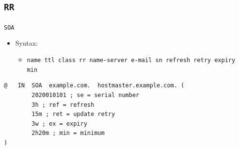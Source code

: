 \documentclass[aspectratio=169,xcolor=table]{beamer}
\begin{document}
\subsection{\texttt{RR}}
\begin{frame}[fragile]{\texttt{SOA}}
  \begin{itemize}
    \item Syntax:
      \begin{itemize}
        \item \texttt{name ttl class rr name-server e-mail sn refresh retry expiry min}
      \end{itemize}
  \end{itemize}
  \begin{tcolorbox}
    \lstset{
      basicstyle=\scriptsize\ttfamily,
    }
    \begin{lstlisting}
@   IN  SOA  example.com.  hostmaster.example.com. (
        2020010101 ; se = serial number
        3h ; ref = refresh
        15m ; ret = update retry
        3w ; ex = expiry
        2h20m ; min = minimum
)
    \end{lstlisting}
    \end{tcolorbox}
\end{frame}
\end{document}
